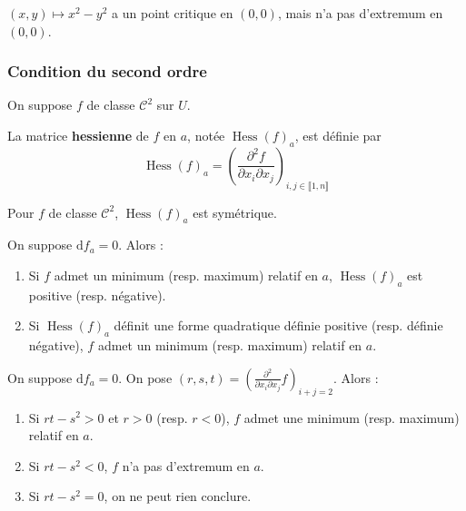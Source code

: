   \begin{cexample}
    $(x,y) \mapsto x^2-y^2$ a un point critique en $(0,0)$, mais n'a pas d'extremum en $(0,0)$.
  \end{cexample}

  \subsubsection{Condition du second ordre}


  On suppose $f$ de classe $\mathcal{C}^2$ sur $U$.

  \begin{definition}
    La matrice \textbf{hessienne} de $f$ en $a$, notée $\operatorname{Hess}(f)_a$, est définie par
    \[ \operatorname{Hess}(f)_a = \left( \frac{\partial^2 f}{\partial x_i \partial x_j} \right)_{i,j \in \llbracket 1, n \rrbracket} \]
  \end{definition}

  \begin{remark}
    Pour $f$ de classe $\mathcal{C}^2$, $\operatorname{Hess}(f)_a$ est symétrique.
  \end{remark}

  \begin{theorem}
    On suppose $\mathrm{d}f_a = 0$. Alors :
    \begin{enumerate}[label={\bfseries(\roman*)}]
      \item Si $f$ admet un minimum (resp. maximum) relatif en $a$, $\operatorname{Hess}(f)_a$ est positive (resp. négative).
      \item Si $\operatorname{Hess}(f)_a$ définit une forme quadratique définie positive (resp. définie négative), $f$ admet un minimum (resp. maximum) relatif en $a$.
    \end{enumerate}
  \end{theorem}

  \begin{example}
    On suppose $\mathrm{d}f_a = 0$. On pose $(r,s,t) = \left(  \frac{\partial^2}{\partial x_i \partial x_j} f \right)_{i+j=2}$. Alors :
    \begin{enumerate}[label={\bfseries(\roman*)}]
      \item Si $rt-s^2 > 0$ et $r > 0$ (resp. $r < 0$), $f$ admet une minimum (resp. maximum) relatif en $a$.
      \item Si $rt-s^2 < 0$, $f$ n'a pas d'extremum en $a$.
      \item Si $rt-s^2 = 0$, on ne peut rien conclure.
    \end{enumerate}
  \end{example}

